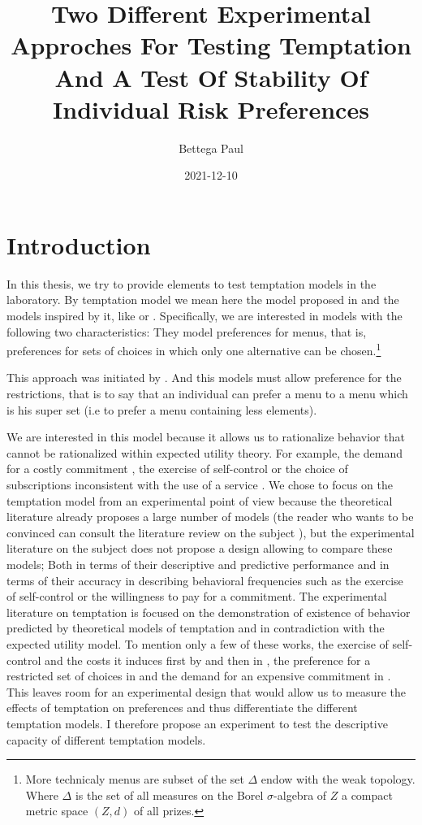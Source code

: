 \documentclass[
]{book}
\title{Two Different Experimental Approches For Testing Temptation And A Test Of Stability Of Individual Risk Preferences}
\author{Bettega Paul}
\date{2021-12-10}
\begin{document}
\maketitle

{
\setcounter{tocdepth}{1}
\tableofcontents
}
\hypertarget{intro1}{%
\chapter{Introduction}\label{intro1}}

In this thesis, we try to provide elements to test temptation models in the
laboratory.
By temptation model we mean here the model proposed in \citet{gul2001temptation} and
the models inspired by it, like \citet{noor2010uphill} or \citet{noor2015menu}.
Specifically, we are interested in models with the following two characteristics:
They model preferences for menus, that is, preferences for sets of choices in
which only one alternative can be chosen.\footnote{More technicaly menus are subset of the set \(\Delta\) endow with the weak
  topology.
  Where \(\Delta\) is the set of all measures on the Borel \(\sigma\)-algebra of \(Z\) a
  compact metric space \((Z,d)\) of all prizes.}

This approach was initiated by \citet{kreps1979representation}.
And this models must allow preference for the restrictions, that is to say that
an individual can prefer a menu to a menu which is his super set
(i.e to prefer a menu containing less elements).

We are interested in this model because it allows us to rationalize behavior
that cannot be rationalized within expected utility theory.
For example, the demand for a costly commitment \citep{bryan2010commitment, ashraf2006tying}, the exercise of self-control \citep{dellavigna2004contract} or the choice of subscriptions inconsistent with the use of a service \citep{dellavigna2006paying}.
We chose to focus on the temptation model from an experimental point of view
because the theoretical literature already proposes a large number of models
(the reader who wants to be convinced can consult the literature review on the subject \citet{lipman2013temptation}), but the experimental literature on the subject does not propose a design allowing to compare these models;
Both in terms of their descriptive and predictive performance and in terms of their accuracy in describing behavioral frequencies such as the exercise of self-control or the willingness to pay for a commitment.
The experimental literature on temptation is focused on the demonstration of existence of
behavior predicted by theoretical models of temptation and in contradiction with
the expected utility model.
To mention only a few of these works, the exercise of self-control and the costs
it induces first by \citet{mischel1989delay} and then in \citet{kuhn2014self}, the preference for a
restricted set of choices in \citet{toussaert2018eliciting} and the demand for an expensive
commitment in \citet{houser2018temptation}.
This leaves room for an experimental design that would allow us to measure the
effects of temptation on preferences and thus differentiate the different
temptation models.
I therefore propose an experiment to test the descriptive capacity of different
temptation models.
\end{document}

